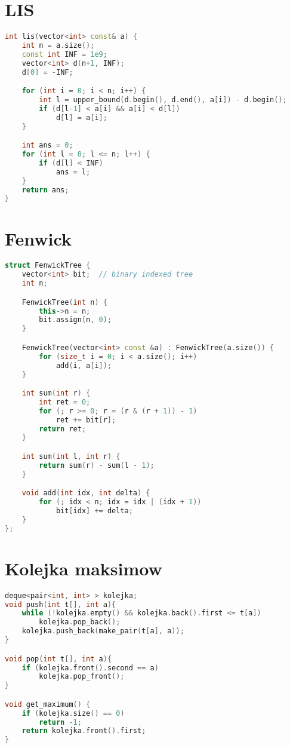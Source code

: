 \documentclass[notitlepage]{report}
\begin{document}
\section*{LIS}
\begin{lstlisting}[language=C++,basicstyle=\footnotesize]
int lis(vector<int> const& a) {
    int n = a.size();
    const int INF = 1e9;
    vector<int> d(n+1, INF);
    d[0] = -INF;

    for (int i = 0; i < n; i++) {
        int l = upper_bound(d.begin(), d.end(), a[i]) - d.begin();
        if (d[l-1] < a[i] && a[i] < d[l])
            d[l] = a[i];
    }

    int ans = 0;
    for (int l = 0; l <= n; l++) {
        if (d[l] < INF)
            ans = l;
    }
    return ans;
}
\end{lstlisting}
\section*{Fenwick}
\begin{lstlisting}[language=C++,basicstyle=\footnotesize]
struct FenwickTree {
    vector<int> bit;  // binary indexed tree
    int n;

    FenwickTree(int n) {
        this->n = n;
        bit.assign(n, 0);
    }

    FenwickTree(vector<int> const &a) : FenwickTree(a.size()) {
        for (size_t i = 0; i < a.size(); i++)
            add(i, a[i]);
    }

    int sum(int r) {
        int ret = 0;
        for (; r >= 0; r = (r & (r + 1)) - 1)
            ret += bit[r];
        return ret;
    }

    int sum(int l, int r) {
        return sum(r) - sum(l - 1);
    }

    void add(int idx, int delta) {
        for (; idx < n; idx = idx | (idx + 1))
            bit[idx] += delta;
    }
};
\end{lstlisting}
\section*{Kolejka maksimow}
\begin{lstlisting}[language=C++,basicstyle=\footnotesize]
deque<pair<int, int> > kolejka;
void push(int t[], int a){
    while (!kolejka.empty() && kolejka.back().first <= t[a])
        kolejka.pop_back();
    kolejka.push_back(make_pair(t[a], a));
}

void pop(int t[], int a){
    if (kolejka.front().second == a)
        kolejka.pop_front();
}

void get_maximum() {
    if (kolejka.size() == 0)
        return -1;
    return kolejka.front().first;
}
\end{lstlisting}
\end{document}

